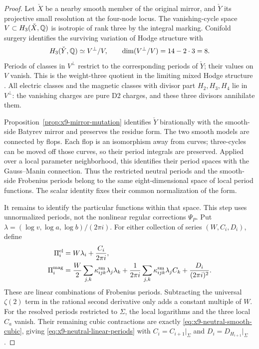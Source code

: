 \begin{proof}
Let $\check X$ be a nearby smooth member of the original mirror,
and $\check Y$ its projective small resolution at the four-node
locus. The vanishing-cycle space $V\subset H_3(\check X,\mathbb Q)$
is isotropic of rank three by the integral marking. Conifold
surgery identifies the surviving variation of Hodge structure with
\begin{equation}
 H_3(\check Y,\mathbb Q)\simeq V^\perp/V,
 \qquad \dim(V^\perp/V)=14-2\cdot3=8.
 \label{eq:x9-neutral-period-quotient}
\end{equation}
Periods of classes in $V^\perp$ restrict to the corresponding
periods of $\check Y$; their values on $V$ vanish. This is the
weight-three quotient in the limiting mixed Hodge structure
\cite[Corollary~1.11 and Section~3.3]{Lee:2018Conifold}.
All electric classes and the magnetic classes with divisor part
$H_2,H_3,H_4$ lie in $V^\perp$: the vanishing charges are pure
D2 charges, and these three divisors annihilate them.

Proposition~\ref{prop:x9-mirror-mutation} identifies $\check Y$
birationally with the smooth-side Batyrev mirror and preserves the
residue form. The two smooth models are connected by flops.
Each flop is an isomorphism away from curves; three-cycles can be
moved off those curves, so their period integrals are preserved.
Applied over a local parameter neighborhood, this identifies their
period spaces with the Gauss--Manin connection. Thus the restricted
neutral periods and the smooth-side Frobenius periods belong to
the same eight-dimensional space of local period functions.
The scalar identity fixes their common normalization of the form.

It remains to identify the particular functions within that space.
This step uses unnormalized periods, not the nonlinear regular
corrections $\Psi_P$. Put
$\lambda=(\log v,\log a,\log b)/(2\pi i)$.
For either collection of series $(W,C_i,D_i)$, define
\begin{equation}
 \begin{aligned}
 \Pi^{\rm el}_i&=W\lambda_i+\frac{C_i}{2\pi i},\\
 \Pi^{\rm mag}_i&=\frac W2\sum_{j,k}\kappa^{\rm sm}_{ijk}
                         \lambda_j\lambda_k
   +\frac1{2\pi i}\sum_{j,k}\kappa^{\rm sm}_{ijk}\lambda_j C_k
   +\frac{D_i}{(2\pi i)^2}.
 \end{aligned}
 \label{eq:x9-neutral-linear-periods}
\end{equation}
These are linear combinations of Frobenius periods. Subtracting
the universal $\zeta(2)$ term in the rational second derivative
only adds a constant multiple of $W$. For the resolved periods
restricted to $\Sigma$, the local logarithms and the three local
$C_a$ vanish. Their remaining cubic contractions are exactly
\eqref{eq:x9-neutral-smooth-cubic}, giving
\eqref{eq:x9-neutral-linear-periods} with
$C_i=C_{i+1}|_\Sigma$ and $D_i=D_{H_{i+1}}|_\Sigma$.


\end{proof}
